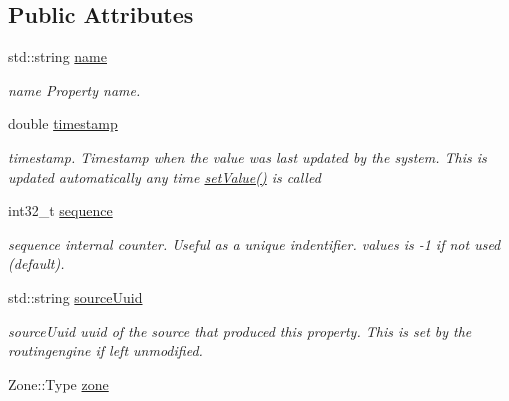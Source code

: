 \subsection*{Public Attributes}
\begin{DoxyCompactItemize}
\item 
std\+::string \hyperlink{classAbstractPropertyType_a0899de35293963a6c18a0f4913916871}{name}
\begin{DoxyCompactList}\small\item\em name Property name. \end{DoxyCompactList}\item 
double \hyperlink{classAbstractPropertyType_a6a391546600fde38a351d3d236be8a9b}{timestamp}
\begin{DoxyCompactList}\small\item\em timestamp. Timestamp when the value was last updated by the system. This is updated automatically any time \hyperlink{classAbstractPropertyType_a1b2598b86718911533587a5bd41bfb9c}{set\+Value()} is called \end{DoxyCompactList}\item 
\hypertarget{classAbstractPropertyType_ae74440c78c4a5f6af1c3b9c85f1a34c2}{int32\+\_\+t \hyperlink{classAbstractPropertyType_ae74440c78c4a5f6af1c3b9c85f1a34c2}{sequence}}\label{classAbstractPropertyType_ae74440c78c4a5f6af1c3b9c85f1a34c2}

\begin{DoxyCompactList}\small\item\em sequence internal counter. Useful as a unique indentifier. values is -\/1 if not used (default). \end{DoxyCompactList}\item 
\hypertarget{classAbstractPropertyType_abe2de53722d28e8e7c2a715b97e1ae48}{std\+::string \hyperlink{classAbstractPropertyType_abe2de53722d28e8e7c2a715b97e1ae48}{source\+Uuid}}\label{classAbstractPropertyType_abe2de53722d28e8e7c2a715b97e1ae48}

\begin{DoxyCompactList}\small\item\em source\+Uuid uuid of the source that produced this property. This is set by the routingengine if left unmodified. \end{DoxyCompactList}\item 
\hypertarget{classAbstractPropertyType_a420b96a1fcbcbe513ff3801185e788bc}{Zone\+::\+Type \hyperlink{classAbstractPropertyType_a420b96a1fcbcbe513ff3801185e788bc}{zone}}\label{classAbstractPropertyType_a420b96a1fcbcbe513ff3801185e788bc}


\end{DoxyCompactItemize}
